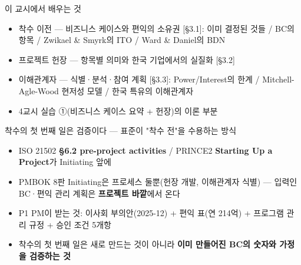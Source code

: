 \begin{frame}{이 교시에서 배우는 것}
\begin{itemize}
\item 착수 이전 — 비즈니스 케이스와 편익의 소유권 [§3.1]: 이미 결정된 것들 / BC의 항목 / Zwikael \& Smyrk의 ITO / Ward \& Daniel의 BDN
\item 프로젝트 헌장 — 항목별 의미와 한국 기업에서의 실질화 [§3.2]
\item 이해관계자 — 식별·분석·참여 계획 [§3.3]: Power/Interest의 한계 / Mitchell-Agle-Wood 현저성 모델 / 한국 특유의 이해관계자
\item 4교시 실습 ①(비즈니스 케이스 요약 + 헌장)의 이론 부분
\end{itemize}
\end{frame}

\begin{frame}{착수의 첫 번째 일은 검증이다 — 표준이 "착수 전"을 수용하는 방식}
\begin{itemize}
\item ISO 21502 \textbf{§6.2 pre-project activities} / PRINCE2 \textbf{Starting Up a Project}가 Initiating 앞에
\item PMBOK 8판 Initiating은 프로세스 둘뿐(헌장 개발, 이해관계자 식별) — 입력인 BC·편익 관리 계획은 \textbf{프로젝트 바깥}에서 온다
\item P1 PM이 받는 것: 이사회 부의안(2025-12) + 편익 표(연 214억) + 프로그램 관리 규정 + 승인 조건 5개항
\item 착수의 첫 번째 일은 새로 만드는 것이 아니라 \textbf{이미 만들어진 BC의 숫자와 가정을 검증하는 것}
\end{itemize}
\end{frame}

